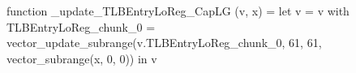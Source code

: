 function _update_TLBEntryLoReg_CapLG (v, x) = let v = { v with TLBEntryLoReg_chunk_0 = vector_update_subrange(v.TLBEntryLoReg_chunk_0, 61, 61, vector_subrange(x, 0, 0)) } in v
